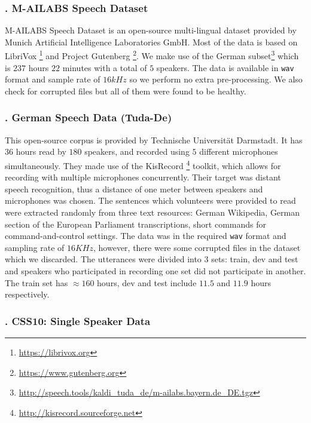\subsubsection{. M-AILABS Speech Dataset}
\label{meth:s2_sub4_subsub2}

M-AILABS Speech Dataset is an open-source multi-lingual dataset provided by Munich Artificial Intelligence Laboratories GmbH. Most of the data is based on LibriVox \footnote{\url{https://librivox.org}} and Project Gutenberg \footnote{\url{https://www.gutenberg.org}}. We make use of the German subset\footnote{\url{http://speech.tools/kaldi_tuda_de/m-ailabs.bayern.de_DE.tgz}} which is $237$ hours $22$ minutes with a total of $5$ speakers. The data is available in \texttt{wav} format and sample rate of $16 kHz$ so we perform no extra pre-processing. We also check for corrupted files but all of them were found to be healthy.

\subsubsection{. German Speech Data (Tuda-De)}
\label{meth:s2_sub4_subsub3}

This open-source corpus \cite{radeck2015open} is provided by Technische Universit{\"a}t Darmstadt. It has $36$ hours read by $180$ speakers, and recorded using $5$ different microphones simultaneously. They made use of the KisRecord \footnote{\url{http://kisrecord.sourceforge.net}} toolkit, which allows for recording with multiple microphones concurrently. Their target was distant speech recognition, thus a distance of one meter between speakers and microphones was chosen. The sentences which volunteers were provided to read were extracted randomly from three text resources: German Wikipedia, German section of the European Parliament transcriptions, short commands for command-and-control settings. The data was in the required \texttt{wav} format and sampling rate of $16 KHz$, however, there were some corrupted files in the dataset which we discarded. The utterances were divided into 3 sets: train, dev and test and speakers who participated in recording one set did not participate in another. The train set has $\approx160$ hours, dev and test include $11.5$ and $11.9$ hours respectively.   

\subsubsection{. CSS10: Single Speaker Data}
\label{meth:s2_sub4_subsub4}

